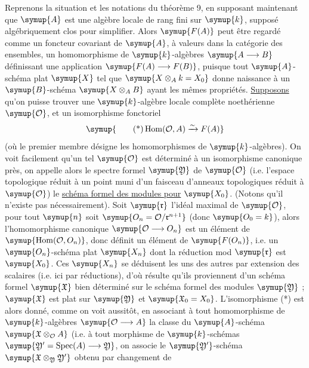 Reprenons la situation et les notations du théorème 9, en supposant maintenant
que $\symup{A}$ est une algèbre locale de rang fini sur $\symup{k}$, supposé algébriquement
clos pour simplifier. Alors $\symup{F(A)}$ peut être regardé comme un foncteur
covariant de $\symup{A}$, à valeurs dans la catégorie des ensembles, un homomorphisme
de $\symup{k}$-algèbres $\symup{A\longrightarrow B}$ définissant une application
$\symup{F(A)\longrightarrow F(B)}$, puisque tout $\symup{A}$-schéma plat $\symup{X}$ tel que
$\symup{X\otimes_A k=X_0}$ donne naissance à un $\symup{B}$-schéma $\symup{X\otimes_A B}$ ayant les
mêmes propriétés. \uline{Supposons} qu'on puisse trouver une $\symup{k}$-algèbre locale
complète noethérienne $\symup{\mathcal O}$, et un isomorphisme fonctoriel
\begin{equation}
  \symup{\tag{*}
  \operatorname{Hom}(\mathcal O,A)\xrightarrow{\sim}F(A)}
\end{equation}
(où le premier membre désigne les homomorphismes de $\symup{k}$-algèbres). On voit
facilement qu'un tel $\symup{\mathcal O}$ est déterminé à un isomorphisme canonique
près, on appelle alors le spectre formel $\symup{\mathfrak Y}$ de $\symup{\mathcal O}$ (i.e.
l'espace topologique réduit à un point muni d'un faisceau d'anneaux
topologiques réduit à $\symup{\mathcal O}$) le \uline{schéma formel des modules pour}
$\symup{X_0}$. (Notons qu'il n'existe pas nécessairement). Soit $\symup{\mathfrak r}$ l'idéal
maximal de $\symup{\mathcal O}$, pour tout $\symup{n}$ soit
$\symup{O_n=\mathcal O/\mathfrak r^{n+1}}$ (donc $\symup{O_0=k}$), alors
l'homomorphisme canonique $\symup{\mathcal O\longrightarrow O_n}$ est un
élément de $\symup{\operatorname{Hom}(\mathcal O,O_n)}$, donc définit un
élément de $\symup{F(O_n)}$, i.e. un $\symup{O_n}$-schéma plat $\symup{X_n}$ dont la
réduction mod $\symup{\mathfrak r}$ est $\symup{X_0}$. Ces $\symup{X_n}$ se déduisent les uns des
autres par extension des scalaires (i.e. ici par réductions), d'où résulte
qu'ils proviennent d'un schéma formel $\symup{\mathfrak X}$ bien déterminé sur le
schéma formel des modules $\symup{\mathfrak Y}$ ; $\symup{\mathfrak X}$ est plat sur
$\symup{\mathfrak Y}$ et $\symup{\mathfrak X_0=X_0}$. L'isomorphisme (*) est alors donné,
comme on voit aussitôt, en associant à tout homomorphisme de $\symup{k}$-algèbres
$\symup{\mathcal O\longrightarrow A}$ la classe du $\symup{A}$-schéma
$\symup{\mathfrak X\otimes_{\mathcal O}A}$ (i.e. à tout morphisme de $\symup{k}$-schémas
$\symup{\mathfrak Y'=\operatorname{Spec}(A)\longrightarrow\mathfrak Y}$, on associe le
$\symup{\mathfrak Y'}$-schéma $\symup{\mathfrak X\otimes_{\mathfrak Y}\mathfrak Y'}$ obtenu par changement de
